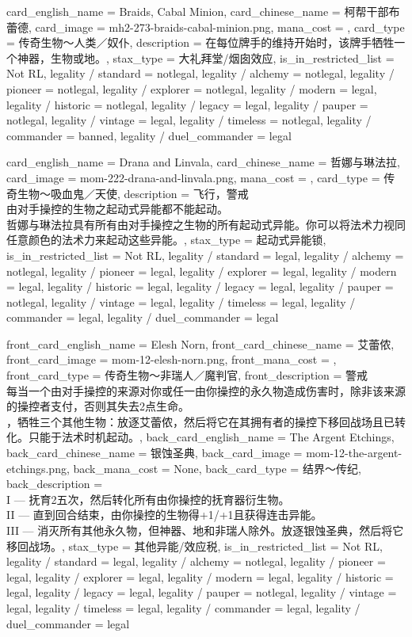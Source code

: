 \documentclass[lang = cn, color = black, 10pt]{AllThatStax}
\begin{document}
\card
{
	card_english_name = {Braids, Cabal Minion},
	card_chinese_name = {柯帮干部布蕾德},
	card_image = mh2-273-braids-cabal-minion.png,
	mana_cost = ,
	card_type = 传奇生物～人类／奴仆,
	description = {在每位牌手的维持开始时，该牌手牺牲一个神器，生物或地。},
	stax_type = 大礼拜堂/烟囱效应,
	is_in_restricted_list = Not RL,
	legality / standard = notlegal,
	legality / alchemy = notlegal,
	legality / pioneer = notlegal,
	legality / explorer = notlegal,
	legality / modern = legal,
	legality / historic = notlegal,
	legality / legacy = legal,
	legality / pauper = notlegal,
	legality / vintage = legal,
	legality / timeless = notlegal,
	legality / commander = banned,
	legality / duel_commander = legal
}

\card
{
	card_english_name = {Drana and Linvala},
	card_chinese_name = {哲娜与琳法拉},
	card_image = mom-222-drana-and-linvala.png,
	mana_cost = ,
	card_type = 传奇生物～吸血鬼／天使,
	description = {飞行，警戒\\
由对手操控的生物之起动式异能都不能起动。\\
哲娜与琳法拉具有所有由对手操控之生物的所有起动式异能。你可以将法术力视同任意颜色的法术力来起动这些异能。},
	stax_type = 起动式异能锁,
	is_in_restricted_list = Not RL,
	legality / standard = legal,
	legality / alchemy = notlegal,
	legality / pioneer = legal,
	legality / explorer = legal,
	legality / modern = legal,
	legality / historic = legal,
	legality / legacy = legal,
	legality / pauper = notlegal,
	legality / vintage = legal,
	legality / timeless = legal,
	legality / commander = legal,
	legality / duel_commander = legal
}

\mfcard
{
	front_card_english_name = {Elesh Norn},
	front_card_chinese_name = {艾蕾侬},
	front_card_image = mom-12-elesh-norn.png,
	front_mana_cost = ,
	front_card_type = 传奇生物～非瑞人／魔判官,
	front_description = {警戒\\
每当一个由对手操控的来源对你或任一由你操控的永久物造成伤害时，除非该来源的操控者支付，否则其失去2点生命。\\
，牺牲三个其他生物：放逐艾蕾侬，然后将它在其拥有者的操控下移回战场且已转化。只能于法术时机起动。},
	back_card_english_name = {The Argent Etchings},
	back_card_chinese_name = {银蚀圣典},
	back_card_image = mom-12-the-argent-etchings.png,
	back_mana_cost = None,
	back_card_type = 结界～传纪,
	back_description = {\\
I — 抚育2五次，然后转化所有由你操控的抚育器衍生物。\\
II — 直到回合结束，由你操控的生物得+1/+1且获得连击异能。\\
III — 消灭所有其他永久物，但神器、地和非瑞人除外。放逐银蚀圣典，然后将它移回战场。},
	stax_type = 其他异能/效应税,
	is_in_restricted_list = Not RL,
	legality / standard = legal,
	legality / alchemy = notlegal,
	legality / pioneer = legal,
	legality / explorer = legal,
	legality / modern = legal,
	legality / historic = legal,
	legality / legacy = legal,
	legality / pauper = notlegal,
	legality / vintage = legal,
	legality / timeless = legal,
	legality / commander = legal,
	legality / duel_commander = legal
}
\end{document}
